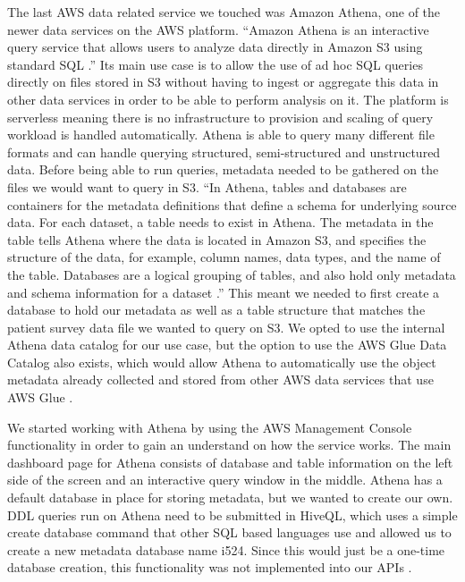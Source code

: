 The last AWS data related service we touched was Amazon Athena, one of the newer data services on the AWS platform. ``Amazon Athena is an interactive query service that allows users to analyze data directly in Amazon S3 using standard SQL \cite{hid-sp18-521-whatisathena}.'' Its main use case is to allow the use of ad hoc SQL queries directly on files stored in S3 without having to ingest or aggregate this data in other data services in order to be able to perform analysis on it. The platform is serverless meaning there is no infrastructure to provision and scaling of query workload is handled automatically. Athena is able to query many different file formats and can handle querying structured, semi-structured and unstructured data. Before being able to run queries, metadata needed to be gathered on the files we would want to query in S3. ``In Athena, tables and databases are containers for the metadata definitions that define a schema for underlying source data. For each dataset, a table needs to exist in Athena. The metadata in the table tells Athena where the data is located in Amazon S3, and specifies the structure of the data, for example, column names, data types, and the name of the table. Databases are a logical grouping of tables, and also hold only metadata and schema information for a dataset \cite{hid-sp18-521-whatisathena}.'' This meant we needed to first create a database to hold our metadata as well as a table structure that matches the patient survey data file we wanted to query on S3. We opted to use the internal Athena data catalog for our use case, but the option to use the AWS Glue Data Catalog also exists, which would allow Athena to automatically use the object metadata already collected and stored from other AWS data services that use AWS Glue \cite{hid-sp18-521-whatisathena}.  

We started working with Athena by using the AWS Management Console functionality in order to gain an understand on how the service works. The main dashboard page for Athena consists of database and table information on the left side of the screen and an interactive query window in the middle. Athena has a default database in place for storing metadata, but we wanted to create our own. DDL queries run on Athena need to be submitted in HiveQL, which uses a simple create database command that other SQL based languages use and allowed us to create a new metadata database name i524. Since this would just be a one-time database creation, this functionality was not implemented into our APIs \cite{hid-sp18-521-whatisathena}. 

